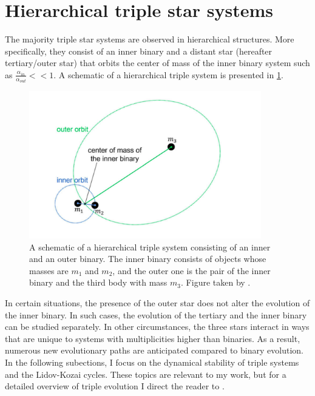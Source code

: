 \section{Hierarchical triple star systems}\label{sec:triples_evolution}

The majority triple star systems are observed in hierarchical structures. More specifically, they consist of an inner binary and a distant star (hereafter tertiary/outer star) that orbits the center of mass of the inner binary system such as $\frac{\alpha_{in}}{\alpha_{out}} << 1$. A schematic of a hierarchical triple system is presented in \cref{fig:triple_schem}.
\begin{figure}[H]
    \centering
    \includegraphics[width=0.9\textwidth]{Thesis/figures/triple_schem.pdf}
    \caption{A schematic of a hierarchical triple system consisting of an inner and an outer binary. The inner binary consists of objects whose masses are $m_1$ and $m_2$, and the outer one is the pair of the inner binary and the third body with mass $m_3$. Figure taken by \cite{gupta2020gravitational}.}
    \label{fig:triple_schem}
\end{figure}
In certain situations, the presence of the outer star does not alter the evolution of the inner binary. In such cases, the evolution of the tertiary  and the inner binary can be studied separately. In other circumstances, the three stars interact in ways that are unique to systems with multiplicities higher than binaries. As a result, numerous new evolutionary paths are anticipated compared to binary evolution. In the following subections, I focus on the dynamical stability of triple systems and the Lidov-Kozai cycles. These topics are relevant to my work, but for a detailed overview of triple evolution I direct the reader to \cite{michaely2014secular,toonen2016evolution}.

